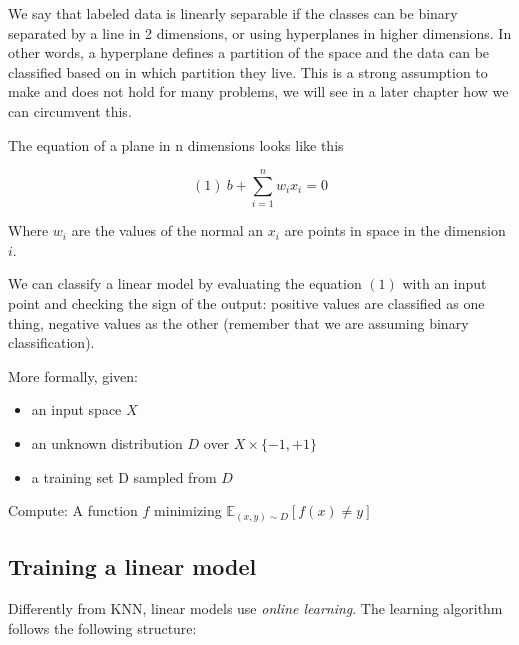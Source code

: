 \documentclass{article}
\begin{document}
We say that labeled data is linearly separable if the classes can be
binary separated by a line in 2 dimensions, or using hyperplanes in
higher dimensions. In other words, a hyperplane defines a partition of
the space and the data can be classified based on in which partition
they live. This is a strong assumption to make and does not hold for
many problems, we will see in a later chapter how we can circumvent
this.

The equation of a plane in n dimensions looks like this

\[(1)\ b+\sum_{i=1}^{n}w_ix_i=0\]

Where \(w_i\) are the values of the normal an \(x_i\) are points in
space in the dimension \(i\).

We can classify a linear model by evaluating the equation \((1)\) with
an input point and checking the sign of the output: positive values are
classified as one thing, negative values as the other (remember that we
are assuming binary classification).

More formally, given:

\begin{itemize}
\tightlist
\item
  an input space \(X\)
\item
  an unknown distribution \(D\) over \(X \times \{ -1,+1 \}\)
\item
  a training set D sampled from \(D\)
\end{itemize}

Compute: A function \(f\) minimizing
\(\mathbb{E}_{(x, y)\sim D}[f(x) \ne  y]\)

\subsection{Training a linear model}\label{training-a-linear-model}

Differently from KNN, linear models use \emph{online learning}. The
learning algorithm follows the following structure:
\end{document}
